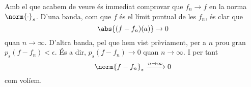 \documentclass[12pt]{article}
\begin{document}
Amb el que acabem de veure és immediat comprovar que \( f_n \to f \) en la norma \(
\norm{\cdot}_s \). D'una banda, com que \( f \) és el límit puntual de les \( f_n \), és
clar que 
\begin{equation*}
	\abs{(f - f_n)(a)} \to 0
\end{equation*}
quan \( n \to \infty \). D'altra banda, pel que hem vist prèviament, per a \( n \) prou
gran \( p_s(f - f_n) < \epsilon \). És a dir, \( p_s(f - f_n) \to 0 \) quan \( n \to
\infty \). I per tant
\begin{equation*}
	\norm{f - f_n}_s \xrightarrow{n \to \infty} 0
\end{equation*}
com volíem.
\end{document}

